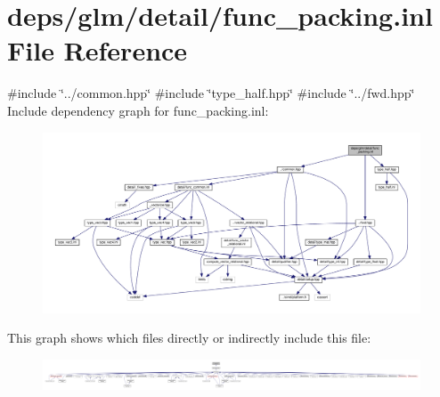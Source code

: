 \hypertarget{func__packing_8inl}{}\section{deps/glm/detail/func\+\_\+packing.inl File Reference}
\label{func__packing_8inl}
{\ttfamily \#include \char`\"{}../common.\+hpp\char`\"{}}\newline
{\ttfamily \#include \char`\"{}type\+\_\+half.\+hpp\char`\"{}}\newline
{\ttfamily \#include \char`\"{}../fwd.\+hpp\char`\"{}}\newline
Include dependency graph for func\+\_\+packing.\+inl\+:
\nopagebreak
\begin{figure}[H]
\begin{center}
\leavevmode
\includegraphics[width=350pt]{de/ddd/func__packing_8inl__incl}
\end{center}
\end{figure}
This graph shows which files directly or indirectly include this file\+:
\nopagebreak
\begin{figure}[H]
\begin{center}
\leavevmode
\includegraphics[width=350pt]{d6/d54/func__packing_8inl__dep__incl}
\end{center}
\end{figure}
